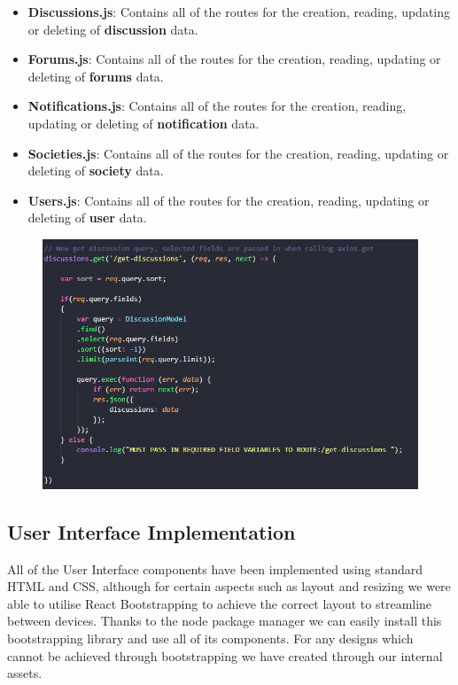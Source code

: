 \begin{itemize}
    \item \textbf{Discussions.js}: Contains all of the routes for the creation, reading, updating or deleting of \textbf{discussion} data.
    \item \textbf{Forums.js}: Contains all of the routes for the creation, reading, updating or deleting of \textbf{forums} data.
    \item \textbf{Notifications.js}: Contains all of the routes for the creation, reading, updating or deleting of \textbf{notification} data.
    \item \textbf{Societies.js}: Contains all of the routes for the creation, reading, updating or deleting of \textbf{society} data.
    \item \textbf{Users.js}: Contains all of the routes for the creation, reading, updating or deleting of \textbf{user} data.
\end{itemize}

\begin{figure}[H]
  \centering
  \includegraphics[scale=0.5]{img/get-discussions.jpg}
  \label{fig:Get Discussions Route}
\end{figure}

\newpage
\subsection{User Interface Implementation}
All of the User Interface components have been implemented using standard HTML and CSS, although for certain aspects such as layout and resizing we were able to utilise React Bootstrapping \cite{react-bootstrap} to achieve the correct layout to streamline between devices. Thanks to the node package manager we can easily install this bootstrapping library and use all of its components. For any designs which cannot be achieved through bootstrapping we have created through our internal assets.

